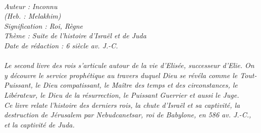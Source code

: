 \BFont
\noindent\hrulefill
{\footnotesize
\textit{
\bigskip
{\centering{}
\\Auteur : Inconnu
\\(Heb. : Melakhim)
\\Signification : Roi, Règne
\\Thème : Suite de l'histoire d'Israël et de Juda
\\Date de rédaction : 6 siècle av. J.-C.\\}
}
\textit{
\\Le second livre des rois s'articule autour de la vie d'Elisée, successeur d'Elie. On y découvre le service prophétique au travers duquel Dieu se révéla comme le Tout-Puissant, le Dieu compatissant, le Maître des temps et des circonstances, le Libérateur, le Dieu de la résurrection, le Puissant Guerrier et aussi le Juge.
\\Ce livre relate l'histoire des derniers rois, la chute d'Israël et sa captivité, la destruction de Jérusalem par Nebudcanetsar, roi de Babylone, en 586 av. J.-C., et la captivité de Juda.\bigskip
}
}
\par\nobreak\noindent\hrulefill
